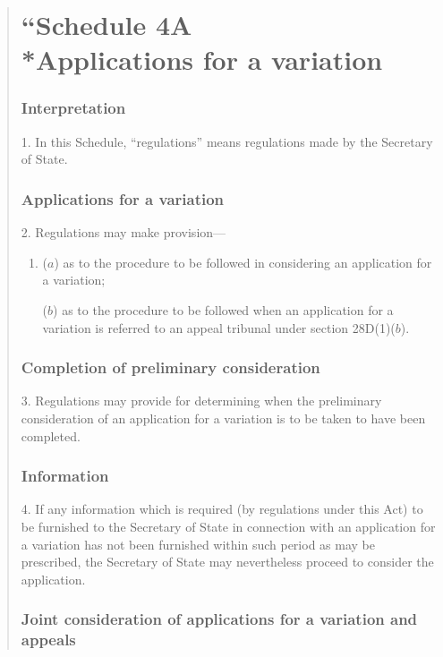 \documentclass[12pt,a4paper]{article}
\begin{document}
\begin{quotation}
\part*{\noindent “S\lowercase{CHEDULE} 4A\\*Applications for a variation}

\section*{Interpretation}

1. In this Schedule, “regulations” means regulations made by the Secretary of State.

\section*{Applications for a variation}

2. Regulations may make provision—
\begin{enumerate}\item[]
($a$) as to the procedure to be followed in considering an application for a variation;

($b$) as to the procedure to be followed when an application for a variation is referred to an appeal tribunal under section 28D(1)($b$).
\end{enumerate}

\section*{Completion of preliminary consideration}

3. Regulations may provide for determining when the preliminary consideration of an application for a variation is to be taken to have been completed.

\section*{Information}

4. If any information which is required (by regulations under this Act) to be furnished to the Secretary of State in connection with an application for a variation has not been furnished within such period as may be prescribed, the Secretary of State may nevertheless proceed to consider the application.

\section*{Joint consideration of applications for a variation and appeals}


\end{quotation}
\end{document}
